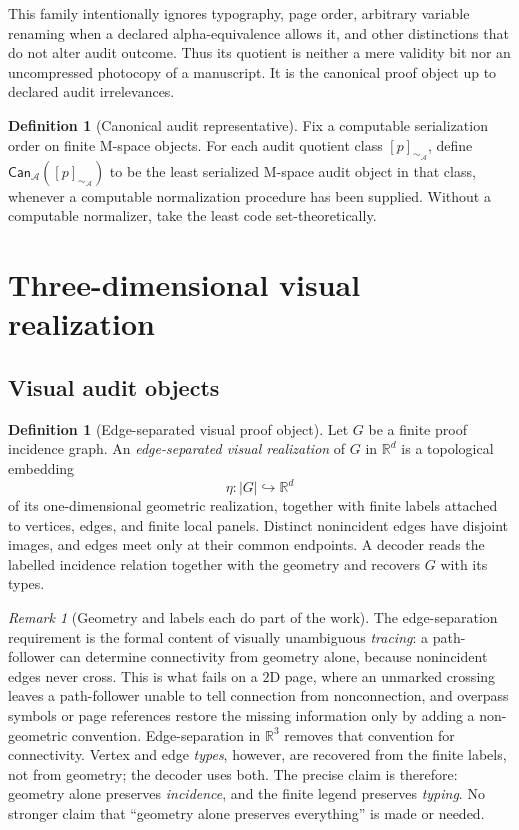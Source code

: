 \documentclass[11pt]{article}
\newcommand{\R}{\mathbb R}
\newcommand{\Can}{\mathsf{Can}}
\newcommand{\eqA}{\mathrel{\sim_{\mathcal A}}}
\newcommand{\mcA}{\mathcal A}
\theoremstyle{plain}
\theoremstyle{definition}
\newtheorem{definition}[theorem]{Definition}
\theoremstyle{remark}
\newtheorem{remark}[theorem]{Remark}
\begin{document}
This family intentionally ignores typography, page order, arbitrary variable renaming when a declared alpha-equivalence allows it, and other distinctions that do not alter audit outcome.  Thus its quotient is neither a mere validity bit nor an uncompressed photocopy of a manuscript.  It is the canonical proof object up to declared audit irrelevances.

\begin{definition}[Canonical audit representative]
\label{def:canonical}
Fix a computable serialization order on finite M-space objects.  For each audit quotient class $[p]_{\eqA}$, define $\Can_{\mcA}([p]_{\eqA})$ to be the least serialized M-space audit object in that class, whenever a computable normalization procedure has been supplied.  Without a computable normalizer, take the least code set-theoretically.
\end{definition}

\section{Three-dimensional visual realization}
\label{sec:3d}

\subsection{Visual audit objects}

\begin{definition}[Edge-separated visual proof object]
\label{def:visual}
Let $G$ be a finite proof incidence graph.  An \emph{edge-separated visual realization} of $G$ in $\R^d$ is a topological embedding
\[
  \eta:|G|\hookrightarrow\R^d
\]
of its one-dimensional geometric realization, together with finite labels attached to vertices, edges, and finite local panels.  Distinct nonincident edges have disjoint images, and edges meet only at their common endpoints.  A decoder reads the labelled incidence relation together with the geometry and recovers $G$ with its types.
\end{definition}

\begin{remark}[Geometry and labels each do part of the work]
\label{rem:geometry-labels}
The edge-separation requirement is the formal content of visually unambiguous \emph{tracing}: a path-follower can determine connectivity from geometry alone, because nonincident edges never cross.  This is what fails on a $2$D page, where an unmarked crossing leaves a path-follower unable to tell connection from nonconnection, and overpass symbols or page references restore the missing information only by adding a non-geometric convention.  Edge-separation in $\R^3$ removes that convention for connectivity.  Vertex and edge \emph{types}, however, are recovered from the finite labels, not from geometry; the decoder uses both.  The precise claim is therefore: geometry alone preserves \emph{incidence}, and the finite legend preserves \emph{typing}.  No stronger claim that ``geometry alone preserves everything'' is made or needed.
\end{remark}
\end{document}
